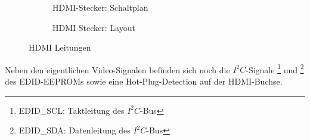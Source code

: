 \begin{figure}[htbp]
        \centering
        \begin{subfigure}[htp]{0.48\textwidth}
%			
			\fbox{	\texttt{[image: TeilB/hdmi\_sch.png]}}
            \caption{HDMI-Stecker: Schaltplan}
            \label{fig:teilb_hdmi_sch}
        \end{subfigure}
\quad 
        \begin{subfigure}[htp]{0.48\textwidth}
 			\caption{HDMI Stecker: Layout}
            \label{fig:teilb_hdmi_pcb}
        \end{subfigure}
        \caption{HDMI Leitungen}
        \label{fig:teilb_hdmi}
\end{figure}
Neben den eigentlichen Video-Signalen befinden sich noch die $I^2C$-Signale \footnote{EDID\_SCL: Taktleitung des $I^2C$-Bus} und \footnote{EDID\_SDA: Datenleitung des $I^2C$-Bus} des EDID-EEPROMs sowie eine Hot-Plug-Detection auf der HDMI-Buchse.
